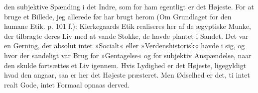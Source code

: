 \documentclass[12pt,a4paper,openany]{book}
\newcommand{\opage}[1]{\marginnote{\footnotesize\textit{[#1]}}}
\begin{document}
den subjektive Spænding i det Indre, som for ham egentligt
er det Højeste. For at bruge et Billede, jeg allerede
før har brugt herom (Om Grundlaget for den humane Etik.
p. 101 f.): Kierkegaards Etik realiseres her af de ægyptiske
Munke, der tilbragte deres Liv med at vande Stokke,
de havde plantet i Sandet. Det var en Gerning, der
absolut intet »Socialt« eller »Verdenshistorisk« havde i
sig, og hvor der sandeligt var Brug for »Gentagelse« og
for subjektiv Anspændelse, naar den skulde fortsættes et
Liv igennem. Hvis Lydighed er det Højeste, ligegyldigt
hvad den angaar, saa er her det Højeste præsteret. Men
\opage{105}Ødselhed er det, ti intet realt Gode, intet Formaal opnaas
derved.
\end{document}
